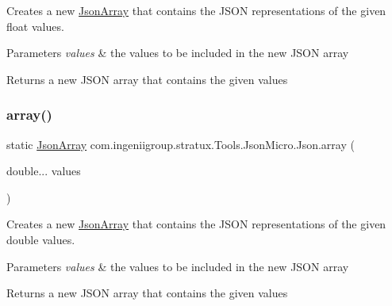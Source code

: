 Creates a new \hyperlink{classcom_1_1ingeniigroup_1_1stratux_1_1_tools_1_1_json_micro_1_1_json_array}{Json\+Array} that contains the J\+S\+ON representations of the given {\ttfamily float} values.


\begin{DoxyParams}{Parameters}
{\em values} & the values to be included in the new J\+S\+ON array \\
\hline
\end{DoxyParams}
\begin{DoxyReturn}{Returns}
a new J\+S\+ON array that contains the given values 
\end{DoxyReturn}
\mbox{\label{classcom_1_1ingeniigroup_1_1stratux_1_1_tools_1_1_json_micro_1_1_json_a9881cc1d5a3cf29db463ab3ad63b8165}} 
\subsubsection{\texorpdfstring{array()}{array()}\hspace{0.1cm}{\footnotesize\ttfamily [5/7]}}
{\footnotesize\ttfamily static \hyperlink{classcom_1_1ingeniigroup_1_1stratux_1_1_tools_1_1_json_micro_1_1_json_array}{Json\+Array} com.\+ingeniigroup.\+stratux.\+Tools.\+Json\+Micro.\+Json.\+array (\begin{DoxyParamCaption}\item[{double...}]{values }\end{DoxyParamCaption})\hspace{0.3cm}{\ttfamily [static]}}

Creates a new \hyperlink{classcom_1_1ingeniigroup_1_1stratux_1_1_tools_1_1_json_micro_1_1_json_array}{Json\+Array} that contains the J\+S\+ON representations of the given {\ttfamily double} values.


\begin{DoxyParams}{Parameters}
{\em values} & the values to be included in the new J\+S\+ON array \\
\hline
\end{DoxyParams}
\begin{DoxyReturn}{Returns}
a new J\+S\+ON array that contains the given values 
\end{DoxyReturn}
\mbox{\label{classcom_1_1ingeniigroup_1_1stratux_1_1_tools_1_1_json_micro_1_1_json_a15367260fce99aaaf395bfd0ce020ac1}} 
